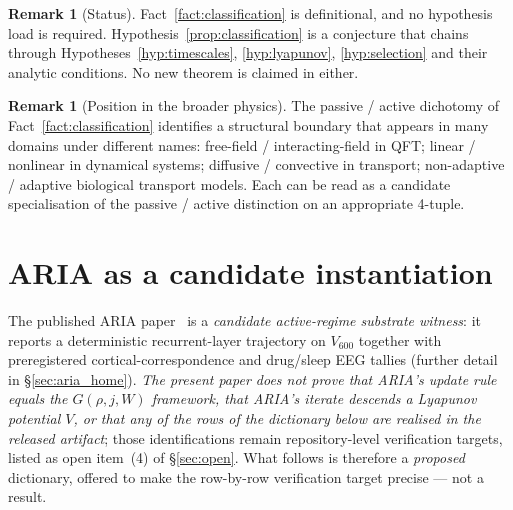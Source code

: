 \documentclass[11pt]{article}
\theoremstyle{definition}
\newtheorem{remark}[theorem]{Remark}
\begin{document}
\begin{remark}[Status]
Fact~\ref{fact:classification} is definitional, and no hypothesis load is required. Hypothesis~\ref{prop:classification} is a conjecture that chains through Hypotheses~\ref{hyp:timescales}, \ref{hyp:lyapunov}, \ref{hyp:selection} and their analytic conditions. No new theorem is claimed in either.
\end{remark}

\begin{remark}[Position in the broader physics]
The passive / active dichotomy of Fact~\ref{fact:classification} identifies a structural boundary that appears in many domains under different names: free-field / interacting-field in QFT; linear / nonlinear in dynamical systems; diffusive / convective in transport; non-adaptive / adaptive biological transport models. Each can be read as a candidate specialisation of the passive / active distinction on an appropriate 4-tuple.
\end{remark}

\section{ARIA as a candidate instantiation}\label{sec:aria}

The published ARIA paper~\citep{SmartARIAChess2026} is a \emph{candidate active-regime substrate witness}: it reports a deterministic recurrent-layer trajectory on $V_{600}$ together with preregistered cortical-correspondence and drug/sleep EEG tallies (further detail in \S\ref{sec:aria_home}). \emph{The present paper does not prove that ARIA's update rule equals the $G(\rho, j, W)$ framework, that ARIA's iterate descends a Lyapunov potential $V$, or that any of the rows of the dictionary below are realised in the released artifact}; those identifications remain repository-level verification targets, listed as open item~(4) of \S\ref{sec:open}. What follows is therefore a \emph{proposed} dictionary, offered to make the row-by-row verification target precise --- not a result.
\end{document}

